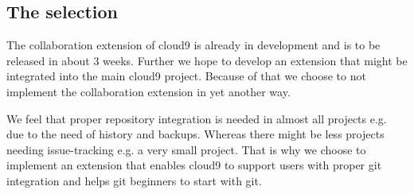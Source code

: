 \subsection{The selection}

The collaboration extension of cloud9 is already in development and is to be released in about 3 weeks.
Further we hope to develop an extension that might be integrated into the main cloud9 project.
Because of that we choose to not implement the collaboration extension in yet another way.

We feel that proper repository integration is needed in almost all projects e.g. due to the need of history and backups.
Whereas there might be less projects needing issue-tracking e.g. a very small project.
That is why we choose to implement an extension that enables cloud9 to support users with proper git integration and helps git beginners to start with git.

